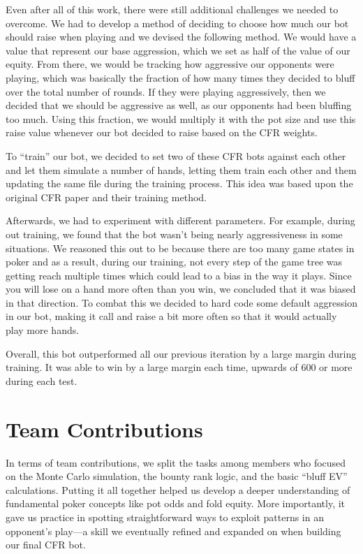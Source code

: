 \documentclass{article}
\begin{document}
    Even after all of this work, there were still additional challenges we needed to overcome. We had to develop a method of deciding to choose how much our bot should raise when playing and we devised the following method. We would have a value that represent our base aggression, which we set as half of the value of our equity. From there, we would be tracking how aggressive our opponents were playing, which was basically the fraction of how many times they decided to bluff over the total number of rounds. If they were playing aggressively, then we decided that we should be aggressive as well, as our opponents had been bluffing too much. Using this fraction, we would multiply it with the pot size and use this raise value whenever our bot decided to raise based on the CFR weights. 

    
    To ``train'' our bot, we decided to set two of these CFR bots against each other and let them simulate a number of hands, letting them train each other and them updating the same file during the training process. This idea was based upon the original CFR paper and their training method. 

    Afterwards, we had to experiment with different parameters. For example, during out training, we found that the bot wasn't being nearly aggressiveness in some situations. We reasoned this out to be because there are too many game states in poker and as a result, during our training, not every step of the game tree was getting reach multiple times which could lead to a bias in the way it plays. Since you will lose on a hand more often than you win, we concluded that it was biased in that direction. To combat this we decided to hard code some default aggression in our bot, making it call and raise a bit more often so that it would actually play more hands.

    Overall, this bot outperformed all our previous iteration by a large margin during training. It was able to win by a large margin each time, upwards of 600 or more during each test. 

    \section*{Team Contributions}

    In terms of team contributions, we split the tasks among members who focused on the Monte Carlo simulation, the bounty rank logic, and the basic “bluff EV” calculations. Putting it all together helped us develop a deeper understanding of fundamental poker concepts like pot odds and fold equity. More importantly, it gave us practice in spotting straightforward ways to exploit patterns in an opponent’s play—a skill we eventually refined and expanded on when building our final CFR bot.
\end{document}
